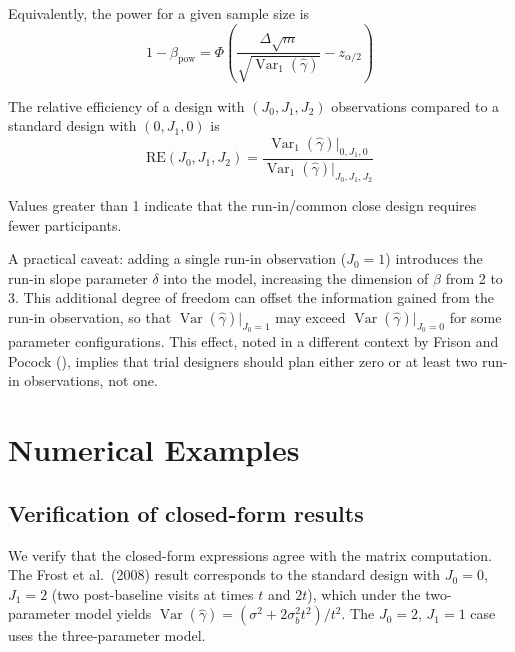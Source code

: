 \documentclass[
  11pt,
]{article}
\begin{document}
Equivalently, the power for a given sample size is \begin{equation}
  1 - \beta_{\text{pow}} = \Phi\!\left(
    \frac{\Delta\sqrt{m}}
      {\sqrt{\mathop{\mathrm{Var}}_1(\hat{\gamma})}}
    - z_{\alpha/2}
  \right)
  \label{eq:power}
\end{equation}

The relative efficiency of a design with \((J_0, J_1, J_2)\)
observations compared to a standard design with \((0, J_1, 0)\) is
\begin{equation}
  \text{RE}(J_0, J_1, J_2)
  = \frac{\mathop{\mathrm{Var}}_1(\hat{\gamma})\big|_{0,J_1,0}}
         {\mathop{\mathrm{Var}}_1(\hat{\gamma})\big|_{J_0,J_1,J_2}}
  \label{eq:RE}
\end{equation}

Values greater than 1 indicate that the run-in/common close design
requires fewer participants.

A practical caveat: adding a single run-in observation (\(J_0=1\))
introduces the run-in slope parameter \(\delta\) into the model,
increasing the dimension of \(\beta\) from 2 to 3. This additional
degree of freedom can offset the information gained from the run-in
observation, so that \(\mathop{\mathrm{Var}}(\hat\gamma)|_{J_0=1}\) may
exceed \(\mathop{\mathrm{Var}}(\hat\gamma)|_{J_0=0}\) for some parameter
configurations. This effect, noted in a different context by Frison and
Pocock (),
implies that trial designers should plan either zero or at least two
run-in observations, not one.

\section{Numerical Examples}\label{numerical-examples}

\subsection{Verification of closed-form
results}\label{verification-of-closed-form-results}

We verify that the closed-form expressions agree with the matrix
computation. The Frost et al.~(2008) result corresponds to the standard
design with \(J_0=0\), \(J_1=2\) (two post-baseline visits at times
\(t\) and \(2t\)), which under the two-parameter model yields
\(\mathop{\mathrm{Var}}(\hat{\gamma}) = (\sigma^2 + 2\sigma_b^2 t^2)/t^2\).
The \(J_0=2\), \(J_1=1\) case uses the three-parameter model.
\end{document}
